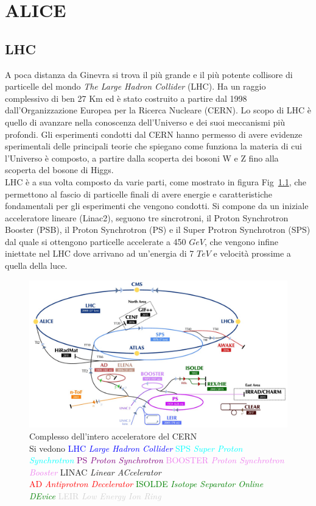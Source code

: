 \chapter{ALICE}

\section{LHC}
A poca distanza da Ginevra si trova il più grande e il più potente collisore di particelle del mondo \textit{The Large Hadron Collider} (LHC). Ha un raggio complessivo di ben 27 Km ed è stato costruito a partire dal 1998 dall'Organizzazione Europea per la Ricerca Nucleare (CERN). Lo scopo di LHC è quello di avanzare nella conoscenza dell'Universo e dei suoi meccanismi più profondi. Gli esperimenti condotti dal CERN hanno permesso di avere evidenze sperimentali delle principali teorie che spiegano come funziona la materia di cui l'Universo è composto,  a partire dalla scoperta dei bosoni W e Z fino alla scoperta del bosone di Higgs. 
\\LHC è a sua volta composto da varie parti, come mostrato in figura Fig~\ref{fig:CERNcomplex}, che permettono al fascio di particelle finali di avere energie e caratteristiche fondamentali per gli esperimenti che vengono condotti. Si compone da un iniziale acceleratore lineare (Linac2), seguono tre sincrotroni, il Proton Synchrotron Booster (PSB), il Proton Synchrotron (PS) e il Super Protron Synchrotron (SPS) dal quale si ottengono particelle accelerate a 450 $GeV$, che vengono infine iniettate nel LHC dove arrivano ad un'energia di 7 $TeV$ e velocità prossime a quella della luce.
  \captionsetup{justification=centerlast} 
    \begin{figure}[htbp]
        \centering
        \includegraphics[width=0.8\linewidth]{ALICE/CernComplex_2018.png}        \caption{Complesso dell'intero acceleratore del CERN \\\small{Si vedono  \textcolor{blue}{LHC \textit{Large Hadron Collider}} \textcolor{cyan}{SPS \textit{Super Proton Synchrotron}} \textcolor{purple}{ PS \textit{Proton Synchrotron}} \textcolor{violet}{BOOSTER \textit{ Proton Synchrotron Booster}} LINAC \textit{Linear ACcelerator}} \\{\footnotesize  \textcolor{red}{AD \textit{Antiprotron Decelerator}} \textcolor{green}{ISOLDE \textit{Isotope Separator Online DEvice}}  \textcolor{lightgray}{LEIR \textit{Low Energy Ion Ring}} }}
        \label{fig:CERNcomplex}
    \end{figure}
    
